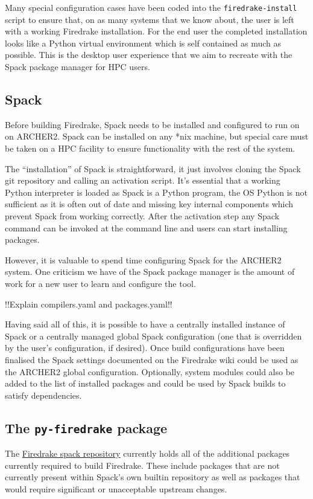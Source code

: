 \documentclass[a4paper,11pt]{article}
\begin{document}
Many special configuration cases have been coded into the \verb`firedrake-install` script to ensure that, on as many systems that we know about, the user is left with a working Firedrake installation.
For the end user the completed installation looks like a Python virtual environment which is self contained as much as possible.
This is the desktop user experience that we aim to recreate with the Spack package manager for HPC users.

\subsection{Spack}
\label{ssec:spack}
Before building Firedrake, Spack needs to be installed and configured to run on on ARCHER2.
Spack can be installed on any *nix machine, but special care must be taken on a HPC facility to ensure functionality with the rest of the system.

The ``installation'' of Spack is straightforward, it just involves cloning the Spack git repository and calling an activation script.
It's essential that a working Python interpreter is loaded as Spack is a Python program, the OS Python is not sufficient as it is often out of date and missing key internal components which prevent Spack from working correctly.
After the activation step any Spack command can be invoked at the command line and users can start installing packages.

However, it is valuable to spend time configuring Spack for the ARCHER2 system.
One criticism we have of the Spack package manager is the amount of work for a new user to learn and configure the tool.

!!Explain compilers.yaml and packages.yaml!!

Having said all of this, it is possible to have a centrally installed instance of Spack or a centrally managed global Spack configuration (one that is overridden by the user's configuration, if desired).
Once build configurations have been finalised the Spack settings documented on the Firedrake wiki could be used as the ARCHER2 global configuration.
Optionally, system modules could also be added to the list of installed packages and could be used by Spack builds to satisfy dependencies.


\subsection{The \texttt{py-firedrake} package}
\label{ssec:py-firedrake}
The \href{https://github.com/firedrakeproject/firedrake-spack}{Firedrake spack repository} currently holds all of the additional packages currently required to build Firedrake. These include packages that are not currently present within Spack's own builtin repository as well as packages that would require significant or unacceptable upstream changes.
\end{document}
